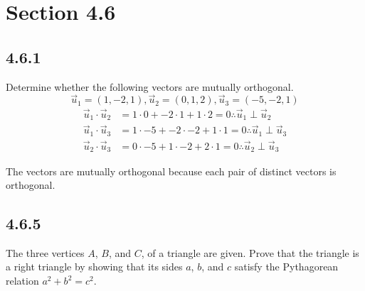 \documentclass{article}
\begin{document}
\newcommand{\hr}{\par\noindent\rule{\textwidth}{0.4pt}}

\newcommand{\bc}[1]{
	\begin{equation*}
		\begin{boxed}
			{#1}
		\end{boxed}
	\end{equation*}
}

\newcommand{\cond}[2]{
	\ifmmode
		{#1} \quad {#2}
	\else
		$$ {#1} \quad {#2} $$
	\fi
}

\newcommand{\matr}[1]{\mathbf{#1}}

\tableofcontents

\section{Section 4.6}

\subsection{4.6.1}

Determine whether the following vectors are mutually orthogonal.
\begin{equation*}
	\vec{u}_1 = (1, -2, 1),
	\vec{u}_2 = (0, 1, 2),
	\vec{u}_3 = (-5, -2, 1)
\end{equation*}
\begin{align*}
	\vec{u}_1 \cdot \vec{u}_2 & = 1 \cdot 0 + -2 \cdot 1 + 1 \cdot 2 = 0 \therefore \vec{u}_1 \perp \vec{u}_2 \\
	\vec{u}_1 \cdot \vec{u}_3 & = 1 \cdot -5 + -2 \cdot -2 + 1 \cdot 1 = 0 \therefore \vec{u}_1 \perp \vec{u}_3 \\
	\vec{u}_2 \cdot \vec{u}_3 & = 0 \cdot -5 + 1 \cdot -2 + 2 \cdot 1 = 0 \therefore \vec{u}_2 \perp \vec{u}_3
\end{align*}
\begin{mdframed}
	The vectors are mutually orthogonal because each pair of distinct vectors is orthogonal.
\end{mdframed}

\subsection{4.6.5}

The three vertices $ A $, $ B $, and $ C $, of a triangle are given. Prove that the triangle is a right triangle by showing that its sides $ a $, $ b $, and $ c $ satisfy the Pythagorean relation $ a^2 + b^2 = c^2 $.
\end{document}
